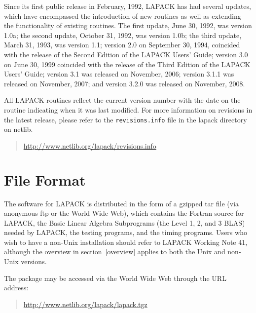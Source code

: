 \documentclass[11pt]{report}
\begin{document}
Since its first public release in February, 1992, LAPACK has had
several updates, which have encompassed the introduction of new routines
as well as extending the functionality of existing routines.  The first
update,
June 30, 1992, was version 1.0a; the second update, October 31, 1992,
was version 1.0b; the third update, March 31, 1993, was version 1.1;
version 2.0 on September 30, 1994, coincided with the release of the
Second Edition of the LAPACK Users' Guide;
version 3.0 on June 30, 1999 coincided with the release of the Third Edition of
the LAPACK Users' Guide;
version 3.1 was released on November, 2006;
version 3.1.1 was released on November, 2007;
and version 3.2.0 was released on November, 2008.

All LAPACK routines reflect the current version number with the date
on the routine indicating when it was last modified.
For more information on revisions in the latest release, please refer
to the \texttt{revisions.info} file in the lapack directory on netlib.
\begin{quote}
\url{http://www.netlib.org/lapack/revisions.info}
\end{quote}

%

\section{File Format}\label{fileformat}

The software for LAPACK is distributed in the form of a
gzipped tar file (via anonymous ftp or the World Wide Web),
which contains the Fortran source for LAPACK,
the Basic Linear Algebra Subprograms
(the Level 1, 2, and 3 BLAS) needed by LAPACK, the testing programs,
and the timing programs\footnotemark[\value{footnote}].
Users who wish to have a non-Unix installation should refer to LAPACK
Working Note 41,
although the overview in section~\ref{overview} applies to both the Unix and non-Unix
versions.

The package may be accessed via the World Wide Web through
the URL address:
\begin{quote}
\url{http://www.netlib.org/lapack/lapack.tgz}
\end{quote}
\end{document}
